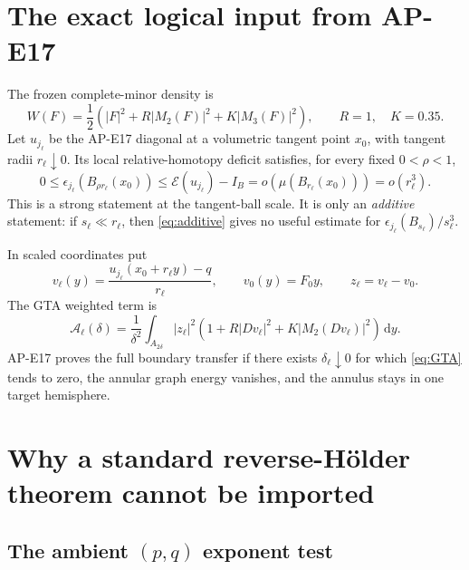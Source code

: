 \documentclass[10pt]{article}
\newcommand{\dd}{\,\mathrm d}
\newcommand{\cE}{\mathcal E}
\newcommand{\cA}{\mathcal A}
\begin{document}
\tableofcontents

\section{The exact logical input from AP-E17}

The frozen complete-minor density is
\begin{equation}
 W(F)=\frac12\left(|F|^2+R|M_2(F)|^2+K|M_3(F)|^2\right),
 \qquad R=1,\quad K=0.35.                              \label{eq:W}
\end{equation}
Let $u_{j_\ell}$ be the AP-E17 diagonal at a volumetric tangent point
$x_0$, with tangent radii $r_\ell\downarrow0$.  Its local relative-homotopy
deficit satisfies, for every fixed $0<\rho<1$,
\begin{equation}
 0\leq\epsilon_{j_\ell}(B_{\rho r_\ell}(x_0))
 \leq \cE(u_{j_\ell})-I_B
 =o\!\left(\mu(B_{r_\ell}(x_0))\right)
 =o(r_\ell^3).                                        \label{eq:additive}
\end{equation}
This is a strong statement at the tangent-ball scale.  It is only an
\emph{additive} statement: if $s_\ell\ll r_\ell$, then
\eqref{eq:additive} gives no useful estimate for
$\epsilon_{j_\ell}(B_{s_\ell})/s_\ell^3$.

In scaled coordinates put
\begin{equation}
 v_\ell(y)=\frac{u_{j_\ell}(x_0+r_\ell y)-q}{r_\ell},
 \qquad v_0(y)=F_0y,\qquad z_\ell=v_\ell-v_0.           \label{eq:tangent}
\end{equation}
The GTA weighted term is
\begin{equation}
 \cA_\ell(\delta)=
 \frac1{\delta^2}\int_{A_{2\delta}}
 |z_\ell|^2\left(1+R|Dv_\ell|^2
                 +K|M_2(Dv_\ell)|^2\right)\dd y .      \label{eq:GTA}
\end{equation}
AP-E17 proves the full boundary transfer if there exists
$\delta_\ell\downarrow0$ for which \eqref{eq:GTA} tends to zero, the
annular graph energy vanishes, and the annulus stays in one target
hemisphere.

\section{Why a standard reverse-H\"older theorem cannot be imported}

\subsection{The ambient \texorpdfstring{\((p,q)\)}{(p,q)} exponent test}
\end{document}
